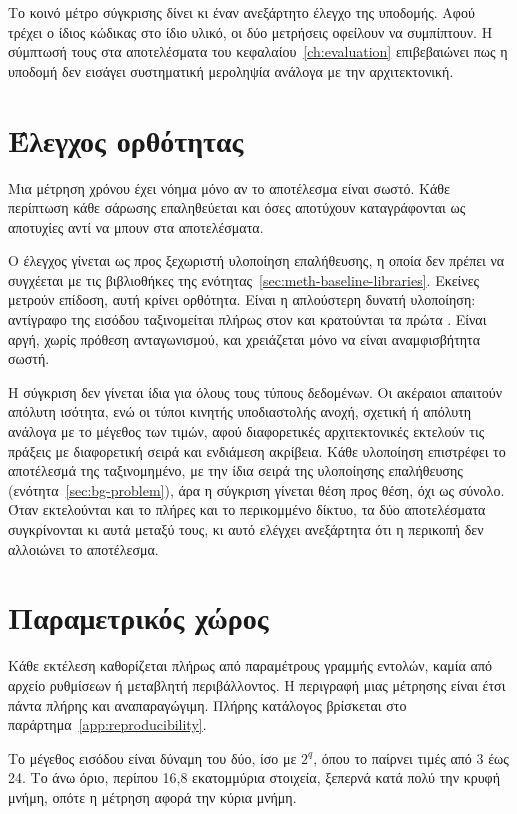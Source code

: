Το κοινό μέτρο σύγκρισης δίνει κι έναν ανεξάρτητο έλεγχο της υποδομής. Αφού
τρέχει ο ίδιος κώδικας στο ίδιο υλικό, οι δύο μετρήσεις οφείλουν να συμπίπτουν.
Η σύμπτωσή τους στα αποτελέσματα του κεφαλαίου~\ref{ch:evaluation} επιβεβαιώνει
πως η υποδομή δεν εισάγει συστηματική μεροληψία ανάλογα με την αρχιτεκτονική.

\section{Έλεγχος ορθότητας}
\label{sec:meth-correctness}

Μια μέτρηση χρόνου έχει νόημα μόνο αν το αποτέλεσμα είναι σωστό. Κάθε περίπτωση
κάθε σάρωσης επαληθεύεται και όσες αποτύχουν καταγράφονται ως αποτυχίες αντί να
μπουν στα αποτελέσματα.

Ο έλεγχος γίνεται ως προς ξεχωριστή υλοποίηση επαλήθευσης, η οποία δεν πρέπει
να συγχέεται με τις βιβλιοθήκες της ενότητας~\ref{sec:meth-baseline-libraries}.
Εκείνες μετρούν επίδοση, αυτή κρίνει ορθότητα. Είναι η απλούστερη δυνατή
υλοποίηση: αντίγραφο της εισόδου ταξινομείται πλήρως στον  και
κρατούνται τα πρώτα . Είναι αργή, χωρίς πρόθεση ανταγωνισμού, και
χρειάζεται μόνο να είναι αναμφισβήτητα σωστή.

Η σύγκριση δεν γίνεται ίδια για όλους τους τύπους δεδομένων. Οι ακέραιοι
απαιτούν απόλυτη ισότητα, ενώ οι τύποι κινητής υποδιαστολής ανοχή, σχετική ή
απόλυτη ανάλογα με το μέγεθος των τιμών, αφού διαφορετικές αρχιτεκτονικές
εκτελούν τις πράξεις με διαφορετική σειρά και ενδιάμεση ακρίβεια. Κάθε
υλοποίηση επιστρέφει το αποτέλεσμά της ταξινομημένο, με την ίδια σειρά της
υλοποίησης επαλήθευσης (ενότητα~\ref{sec:bg-problem}), άρα η σύγκριση γίνεται
θέση προς θέση, όχι ως σύνολο. Όταν εκτελούνται και το πλήρες και το
περικομμένο δίκτυο, τα δύο αποτελέσματα συγκρίνονται κι αυτά μεταξύ τους, κι
αυτό ελέγχει ανεξάρτητα ότι η περικοπή δεν αλλοιώνει το αποτέλεσμα.

\section{Παραμετρικός χώρος}
\label{sec:meth-parameters}

Κάθε εκτέλεση καθορίζεται πλήρως από παραμέτρους γραμμής εντολών, καμία από
αρχείο ρυθμίσεων ή μεταβλητή περιβάλλοντος. Η περιγραφή μιας μέτρησης είναι
έτσι πάντα πλήρης και αναπαραγώγιμη. Πλήρης κατάλογος βρίσκεται στο
παράρτημα~\ref{app:reproducibility}.

Το μέγεθος εισόδου  είναι δύναμη του δύο, ίσο με $2^q$, όπου το 
παίρνει τιμές από 3 έως 24. Το άνω όριο, περίπου 16,8 εκατομμύρια στοιχεία,
ξεπερνά κατά πολύ την κρυφή μνήμη, οπότε η μέτρηση αφορά την κύρια μνήμη.


